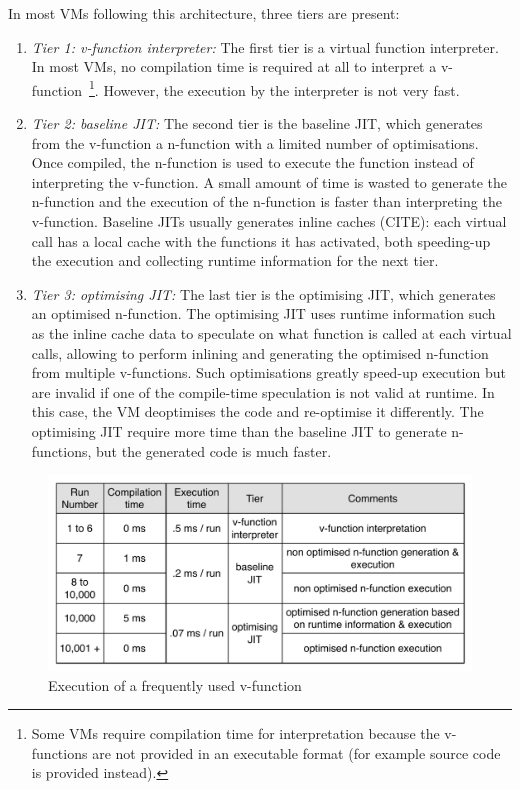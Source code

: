 \documentclass[a4paper,12pt,twoside]{../includes/ThesisStyle}
\begin{document}
In most VMs following this architecture, three tiers are present:
\begin{enumerate}
	\item \emph{Tier 1: v-function interpreter: } The first tier is a virtual function interpreter. In most VMs, no compilation time is required at all to interpret a v-function~\footnote{Some VMs require compilation time for interpretation because the v-functions are not provided in an executable format (for example source code is provided instead).}. However, the execution by the interpreter is not very fast.
	\item \emph{Tier 2: baseline JIT: } The second tier is the baseline JIT, which generates from the v-function a n-function with a limited number of optimisations. Once compiled, the n-function is used to execute the function instead of interpreting the v-function. A small amount of time is wasted to generate the n-function and the execution of the n-function is faster than interpreting the v-function. Baseline JITs usually generates inline caches (CITE): each virtual call has a local cache with the functions it has activated, both speeding-up the execution and collecting runtime information for the next tier.
	\item \emph{Tier 3: optimising JIT: } The last tier is the optimising JIT, which generates an optimised n-function. The optimising JIT uses runtime information such as the inline cache data to speculate on what function is called at each virtual calls, allowing to perform inlining and generating the optimised n-function from multiple v-functions. Such optimisations greatly speed-up execution but are invalid if one of the compile-time speculation is not valid at runtime. In this case, the VM deoptimises the code and re-optimise it differently. The optimising JIT require more time than the baseline JIT to generate n-functions, but the generated code is much faster.
\end{enumerate}

\begin{figure}[h!]
    \begin{center}
        \includegraphics[width=0.95\linewidth]{TieredArchitecture}
        \caption{Execution of a frequently used v-function}
        \label{fig:TieredArchitecture}
    \end{center}
\end{figure}
\end{document}
